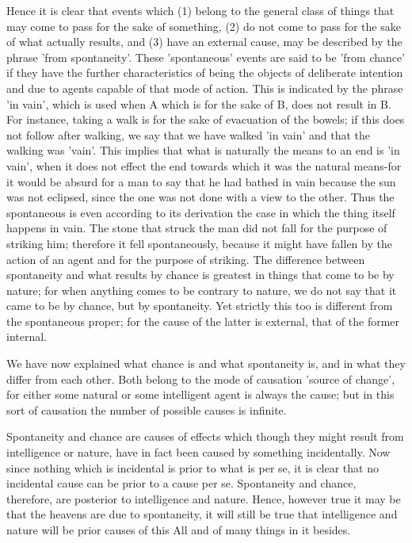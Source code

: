 Hence it is clear that events which (1) belong to the general class
of things that may come to pass for the sake of something, (2) do
not come to pass for the sake of what actually results, and (3) have
an external cause, may be described by the phrase 'from spontaneity'.
These 'spontaneous' events are said to be 'from chance' if they have
the further characteristics of being the objects of deliberate intention
and due to agents capable of that mode of action. This is indicated
by the phrase 'in vain', which is used when A which is for the sake
of B, does not result in B. For instance, taking a walk is for the
sake of evacuation of the bowels; if this does not follow after walking,
we say that we have walked 'in vain' and that the walking was 'vain'.
This implies that what is naturally the means to an end is 'in vain',
when it does not effect the end towards which it was the natural means-for
it would be absurd for a man to say that he had bathed in vain because
the sun was not eclipsed, since the one was not done with a view to
the other. Thus the spontaneous is even according to its derivation
the case in which the thing itself happens in vain. The stone that
struck the man did not fall for the purpose of striking him; therefore
it fell spontaneously, because it might have fallen by the action
of an agent and for the purpose of striking. The difference between
spontaneity and what results by chance is greatest in things that
come to be by nature; for when anything comes to be contrary to nature,
we do not say that it came to be by chance, but by spontaneity. Yet
strictly this too is different from the spontaneous proper; for the
cause of the latter is external, that of the former internal.

We have now explained what chance is and what spontaneity is, and
in what they differ from each other. Both belong to the mode of causation
'source of change', for either some natural or some intelligent agent
is always the cause; but in this sort of causation the number of possible
causes is infinite. 

Spontaneity and chance are causes of effects which though they might
result from intelligence or nature, have in fact been caused by something
incidentally. Now since nothing which is incidental is prior to what
is per se, it is clear that no incidental cause can be prior to a
cause per se. Spontaneity and chance, therefore, are posterior to
intelligence and nature. Hence, however true it may be that the heavens
are due to spontaneity, it will still be true that intelligence and
nature will be prior causes of this All and of many things in it besides.

